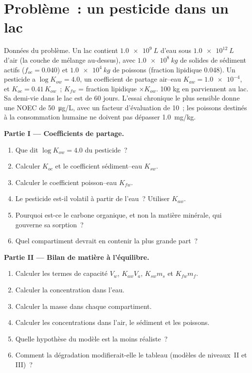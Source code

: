 \section{Problème~: un pesticide dans un lac}

\begin{problem}
\label{pb:b3:environmental-toxicology:1}
Données du problème. Un lac contient $\qty{1.0e9}{L}$ d'eau sous $\qty{1.0e12}{L}$ d'air (la couche de mélange au-dessus),
avec $\qty{1.0e8}{kg}$ de solides de sédiment actifs ($f_{oc} = 0.040$) et $\qty{1.0e4}{kg}$ de poissons (fraction lipidique 0.048).
Un pesticide a $\log K_{ow} = 4.0$, un coefficient de partage air--eau $K_{aw} = \num{1.0e-4}$, et $K_{oc} = 0.41\,K_{ow}$~;
$K_{fw}$ = fraction lipidique $\times K_{ow}$. 100 kg en parviennent au lac. Sa demi-vie dans le lac est de 60 jours.
L'essai chronique le plus sensible donne une NOEC de \qty{50}{\micro g/L}, avec un facteur d'évaluation de 10~;
les poissons destinés à la consommation humaine ne doivent pas dépasser \qty{1.0}{mg/kg}.

\medskip\noindent\textbf{Partie I --- Coefficients de partage.}
\begin{enumerate}
  \item Que dit $\log K_{ow} = 4.0$ du pesticide~?
  \item Calculer $K_{oc}$ et le coefficient sédiment--eau $K_{sw}$.
  \item Calculer le coefficient poisson--eau $K_{fw}$.
  \item Le pesticide est-il volatil à partir de l'eau~? Utiliser $K_{aw}$.
  \item Pourquoi est-ce le carbone organique, et non la matière minérale,
        qui gouverne sa sorption~?
  \item Quel compartiment devrait en contenir la plus grande part~?
\end{enumerate}

\medskip\noindent\textbf{Partie II --- Bilan de matière à l'équilibre.}
\begin{enumerate}[resume]
  \item Calculer les termes de capacité $V_w$, $K_{aw}V_a$, $K_{sw}m_s$ et $K_{fw}m_f$.
  \item Calculer la concentration dans l'eau.
  \item Calculer la masse dans chaque compartiment.
  \item Calculer les concentrations dans l'air, le sédiment et les
        poissons.
  \item Quelle hypothèse du modèle est la moins réaliste~?
  \item Comment la dégradation modifierait-elle le tableau (modèles de
        niveaux~II et III)~?
\end{enumerate}


\end{problem}

